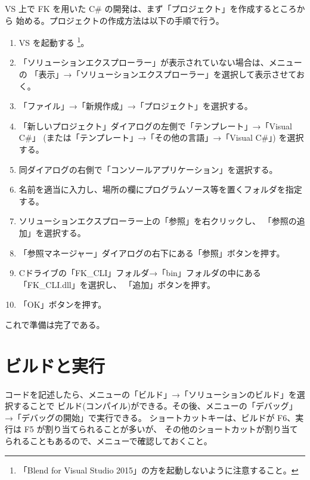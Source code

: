 \documentclass[a4paper]{jsarticle}
\begin{document}
VS 上で FK を用いた C\# の開発は、まず「プロジェクト」を作成するところから
始める。プロジェクトの作成方法は以下の手順で行う。

\begin{enumerate}

 \item VS を起動する
	\footnote{「Blend for Visual Studio 2015」の方を起動しないように注意すること。}。

 \item 「ソリューションエクスプローラー」が表示されていない場合は、メニューの
	「表示」→「ソリューションエクスプローラー」を選択して表示させておく。

 \item 「ファイル」→「新規作成」→「プロジェクト」を選択する。

 \item 「新しいプロジェクト」ダイアログの左側で「テンプレート」→「Visual C\#」
	(または「テンプレート」→「その他の言語」→「Visual C\#」) を選択する。

 \item 同ダイアログの右側で「コンソールアプリケーション」を選択する。

 \item 名前を適当に入力し、場所の欄にプログラムソース等を置くフォルダを指定する。

 \item ソリューションエクスプローラー上の「参照」を右クリックし、
	「参照の追加」を選択する。

 \item 「参照マネージャー」ダイアログの右下にある「参照」ボタンを押す。

 \item Cドライブの「FK\_CLI」フォルダ→「bin」フォルダの中にある「FK\_CLI.dll」を選択し、
	「追加」ボタンを押す。

 \item 「OK」ボタンを押す。

\end{enumerate}

これで準備は完了である。

\section{ビルドと実行}

コードを記述したら、メニューの「ビルド」→「ソリューションのビルド」を選択することで
ビルド(コンパイル)ができる。その後、メニューの「デバッグ」→「デバッグの開始」で実行できる。
ショートカットキーは、ビルドが F6、実行は F5 が割り当てられることが多いが、
その他のショートカットが割り当てられることもあるので、メニューで確認しておくこと。
\end{document}
